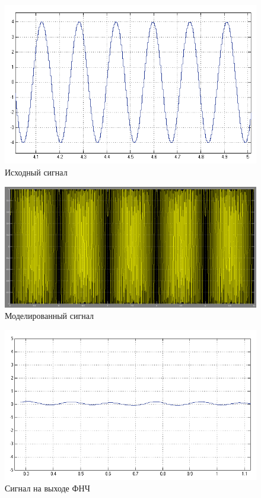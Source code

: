 \begin{figure}[H]
\includegraphics[width=150mm, scale = 0.9]{lab8/PLL_src}
   \caption{Исходный сигнал}
\end{figure}

\begin{figure}[H]
\includegraphics[width=150mm, scale = 0.9]{lab8/8_14}
   \caption{Моделированный сигнал}
\end{figure}

\begin{figure}[H]
\includegraphics[width=150mm, scale = 0.9]{lab8/PLL_result}
   \caption{Сигнал на выходе ФНЧ}
\end{figure}

